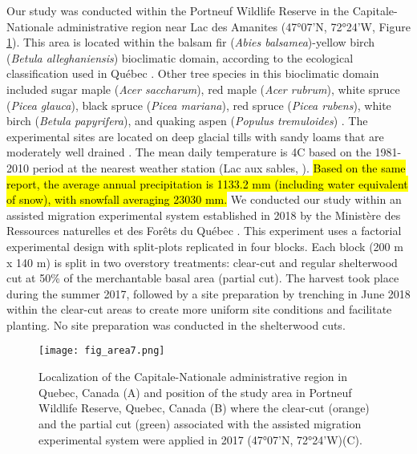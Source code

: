 Our study was conducted within the Portneuf Wildlife Reserve in the Capitale-Nationale administrative region near Lac des Amanites (47°07’N, 72°24’W, Figure \ref{fig:area}). 
This area is located within the balsam fir (\textit{Abies balsamea})-yellow birch (\textit{Betula alleghaniensis}) bioclimatic domain, according to the ecological classification used in Québec \citep{saucierChapitreEcologieForestiere2009}. 
Other tree species in this bioclimatic domain included sugar maple (\textit{Acer saccharum}), red maple (\textit{Acer rubrum}), white spruce (\textit{Picea glauca}), black spruce (\textit{Picea mariana}), red spruce (\textit{Picea rubens}), white birch (\textit{Betula papyrifera}), and quaking aspen (\textit{Populus tremuloides}) \citep{olaBelowgroundCarbonStocks2024}. 
The experimental sites are located on deep glacial tills with sandy loams that are moderately well drained \citep{CanadianSystemSoil1998}. 
The mean daily temperature is 4C based on the 1981-2010 period at the nearest weather station (Lac aux sables, \citealp{environmentcanadaCanadianClimateNormals2019}). 
\hl{Based on the same report, the average annual precipitation is 1133.2 mm (including water equivalent of snow), with snowfall averaging 23030 mm. }
We conducted our study within an assisted migration experimental system established in 2018 by the Ministère des Ressources naturelles et des Forêts du Québec \citep{royoDesiredREgenerationAssisted2023}. 
This experiment uses a factorial experimental design with split-plots replicated in four blocks. 
Each block (200 m x 140 m) is split in two overstory treatments: clear-cut and regular shelterwood cut at 50\% of the merchantable basal area (partial cut). 
The harvest took place during the summer 2017, followed by a site preparation by trenching in June 2018 within the clear-cut areas to create more uniform site conditions and facilitate planting. 
No site preparation was conducted in the shelterwood cuts.

\pagebreak

\begin{figure}[ht!]
	\centering
	\texttt{[image: fig\_area7.png]}
	\caption[\hl{Localization of the Capitale-Nationale administrative region in Quebec}, Canada and position of the study area near Lac des Amanites in Portneuf Wildlife Reserve, Quebec, Canada.]
  {Localization of the Capitale-Nationale administrative region in Quebec, Canada (A) and position of the study area in Portneuf Wildlife Reserve, Quebec, Canada (B) where the clear-cut (orange) and the partial cut (green) associated with the assisted migration experimental system were applied in 2017 (47°07'N, 72°24'W)(C).}
	\label{fig:area}
	\end{figure}  


